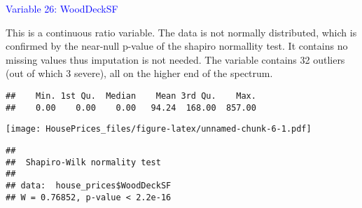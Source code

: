 \documentclass[
]{article}
\newenvironment{Shaded}{\begin{snugshade}}{\end{snugshade}}
\newcommand{\AttributeTok}[1]{\textcolor[rgb]{0.13,0.29,0.53}{#1}}
\newcommand{\CommentTok}[1]{\textcolor[rgb]{0.56,0.35,0.01}{\textit{#1}}}
\newcommand{\ConstantTok}[1]{\textcolor[rgb]{0.56,0.35,0.01}{#1}}
\newcommand{\FunctionTok}[1]{\textcolor[rgb]{0.13,0.29,0.53}{\textbf{#1}}}
\newcommand{\NormalTok}[1]{#1}
\newcommand{\SpecialCharTok}[1]{\textcolor[rgb]{0.81,0.36,0.00}{\textbf{#1}}}
\newcommand{\StringTok}[1]{\textcolor[rgb]{0.31,0.60,0.02}{#1}}
\begin{document}
\textcolor{blue}{Variable 26: WoodDeckSF}

This is a continuous ratio variable. The data is not normally
distributed, which is confirmed by the near-null p-value of the shapiro
normallity test. It contains no missing values thus imputation is not
needed. The variable contains 32 outliers (out of which 3 severe), all
on the higher end of the spectrum.

\begin{Shaded}
\end{Shaded}

\begin{verbatim}
##    Min. 1st Qu.  Median    Mean 3rd Qu.    Max. 
##    0.00    0.00    0.00   94.24  168.00  857.00
\end{verbatim}

\begin{Shaded}
\end{Shaded}

\texttt{[image: HousePrices\_files/figure-latex/unnamed-chunk-6-1.pdf]}

\begin{Shaded}
\end{Shaded}

\begin{verbatim}
## 
##  Shapiro-Wilk normality test
## 
## data:  house_prices$WoodDeckSF
## W = 0.76852, p-value < 2.2e-16
\end{verbatim}
\end{document}
